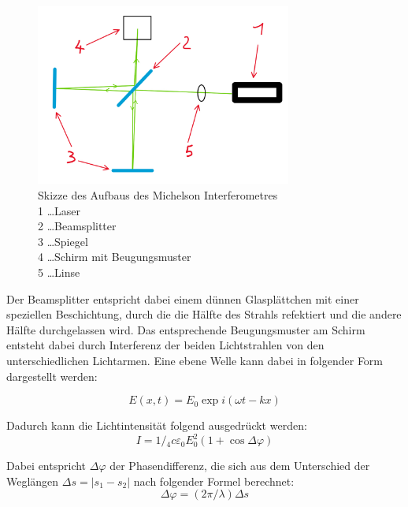 \documentclass[12pt,english,ngerman]{scrartcl}
\begin{document}
\begin{figure}[H]
	\begin{center}
		\includegraphics[width =0.75\textwidth]{./figures/aufbau_interferometer_skizze.jpg}
	\end{center}
	\caption[Skizze des Aufbaus des Michelson Interferometres] 
  {Skizze des Aufbaus des Michelson Interferometres\\
  1 \dots Laser \\
  2 \dots Beamsplitter \\
  3 \dots Spiegel \\
  4 \dots Schirm mit Beugungsmuster\\
  5 \dots Linse 
	}\label{fig:aufbau_interferometer_skizze}
\end{figure}

Der Beamsplitter entspricht dabei einem dünnen Glasplättchen mit einer speziellen Beschichtung, durch die die Hälfte 
des Strahls refektiert und die andere Hälfte durchgelassen wird.
Das entsprechende Beugungsmuster am Schirm entsteht dabei durch Interferenz der beiden Lichtstrahlen von den 
unterschiedlichen Lichtarmen.
Eine ebene Welle kann dabei in folgender Form dargestellt werden:

\begin{equation}
	E(x, t)=E_0 \exp i(\omega t-k x)
\end{equation}

Dadurch kann die Lichtintensität folgend ausgedrückt werden:
\begin{equation}
	I=1 /{ }_4 c \varepsilon_0 E_0^2(1+\cos \Delta \varphi)
\end{equation}

Dabei entspricht $\Delta \varphi$ der Phasendifferenz, die sich aus dem Unterschied der Weglängen $\Delta s=\left|s_1-s_2\right|$ 
nach folgender Formel berechnet:
\begin{equation}
	\Delta \varphi=(2 \pi / \lambda) \Delta s
\end{equation}
\end{document}
